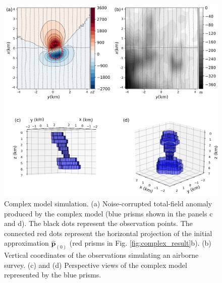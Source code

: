 
\begin{figure}
    \centering
    \includegraphics[width=\linewidth]{figures/complex_model_data.png}
    \caption{Complex model simulation. (a) Noise-corrupted total-field anomaly produced by the complex model (blue prisms shown in the panels c and d). The black dots represent the observation points. The connected red dots represent the horizontal projection 
   	of the initial approximation $\hat{\mathbf{p}}_{(0)}$ 
   	(red prisms in Fig. \ref{fig:complex_result}b). (b) Vertical coordinates of the observations simulating an airborne survey. (c) and (d) Perspective views of the complex model represented by the blue prisms.
}
    \label{fig:complex_model}
\end{figure}


